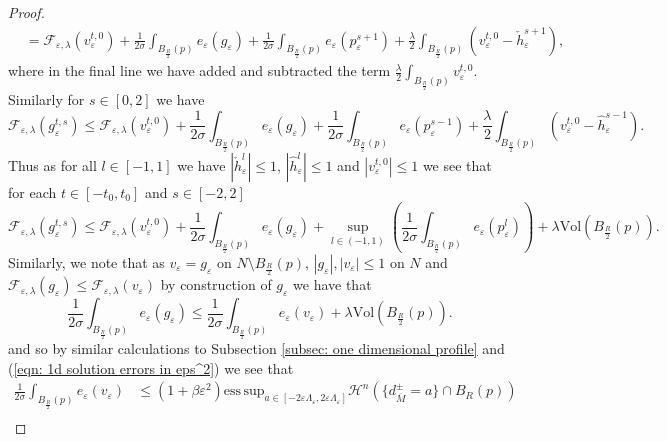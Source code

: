 \documentclass[11pt]{article}
\newcommand{\esssup}{\mathrm{ess\, sup}}
\begin{document}
\begin{proof}
\begin{align*}
    &= \mathcal{F}_{\varepsilon,\lambda}(v^{t,0}_\varepsilon) + \frac{1}{2\sigma}\int_{B_{\frac{R}{2}}(p)} e_\varepsilon(g_\varepsilon) + \frac{1}{2\sigma}\int_{B_{\frac{R}{2}}(p)} e_\varepsilon(p^{s+1}_\varepsilon) +\frac{\lambda}{2}\int_{B_{\frac{R}{2}}(p)} (v^{t,0}_\varepsilon  - \check{h}^{s+1}_\varepsilon),
\end{align*}
where in the final line we have added and subtracted the term $\frac{\lambda}{2}\int_{B_{\frac{R}{2}}(p)}v^{t,0}_\varepsilon$. Similarly for $s \in [0,2]$ we have
\begin{equation*}
    \mathcal{F}_{\varepsilon,\lambda}(g^{t,s}_\varepsilon) \leq  \mathcal{F}_{\varepsilon,\lambda}(v^{t,0}_\varepsilon) + \frac{1}{2\sigma}\int_{B_{\frac{R}{2}}(p)} e_\varepsilon(g_\varepsilon) + \frac{1}{2\sigma}\int_{B_{\frac{R}{2}}(p)} e_\varepsilon(p^{s-1}_\varepsilon)+\frac{\lambda}{2}\int_{B_{\frac{R}{2}}(p)} (v^{t,0}_\varepsilon  - \hat{h}^{s-1}_\varepsilon).
\end{equation*}
Thus as for all $l \in [-1,1]$ we have $|\check{h}^l_\varepsilon| \leq 1$, $|\hat{h}^l_\varepsilon| \leq 1$ and $|v^{t,0}_\varepsilon| \leq 1$ we see that for each $t \in [-t_0,t_0]$ and $s \in [-2,2]$
\begin{equation}\label{eqn: local path bound 1}
    \mathcal{F}_{\varepsilon,\lambda}(g^{t,s}_\varepsilon) \leq \mathcal{F}_{\varepsilon,\lambda}(v^{t,0}_\varepsilon) + \frac{1}{2\sigma}\int_{B_{\frac{R}{2}}(p)} e_\varepsilon(g_\varepsilon) + \sup_{l \in (-1,1)}\left(\frac{1}{2\sigma}\int_{B_{\frac{R}{2}}(p)} e_\varepsilon(p^l_\varepsilon) \right) + \lambda \mathrm{Vol}(B_{\frac{R}{2}}(p)). 
\end{equation}
Similarly, we note that as $v_\varepsilon = g_\varepsilon$ on $N \setminus B_{\frac{R}{2}}(p)$, $|g_\varepsilon|, |v_\varepsilon| \leq 1$ on $N$ and $\mathcal{F}_{\varepsilon,\lambda}(g_\varepsilon) \leq \mathcal{F}_{\varepsilon,\lambda}(v_\varepsilon)$ by construction of $g_\varepsilon$ we have that
\begin{equation*}
    \frac{1}{2\sigma}\int_{B_{\frac{R}{2}}(p)} e_\varepsilon(g_\varepsilon) \leq \frac{1}{2\sigma}\int_{B_{\frac{R}{2}}(p)} e_\varepsilon(v_\varepsilon) + \lambda \mathrm{Vol}(B_{\frac{R}{2}}(p)).
\end{equation*}
and so by similar calculations to Subsection \ref{subsec: one dimensional profile} and (\ref{eqn: 1d solution errors in eps^2}) we see that 
\begin{align*}
    \frac{1}{2\sigma}\int_{B_{\frac{R}{2}}(p)} e_\varepsilon(v_\varepsilon) &\leq (1 + \beta \varepsilon^2){\esssup}_{a \in [-2\varepsilon\Lambda_\varepsilon,2\varepsilon\Lambda_\varepsilon]}\mathcal{H}^n(\{d^\pm_{\overline{M}} = a \} \cap B_R(p))\\

\end{align*}
\end{proof}
\end{document}
